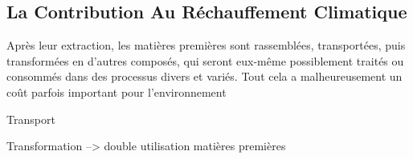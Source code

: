 
\subsection{La Contribution Au Réchauffement Climatique}


Après leur extraction, les matières premières sont rassemblées, transportées, puis transformées en d'autres composés, qui seront eux-même possiblement traités ou consommés dans des processus divers et variés. Tout cela a malheureusement un coût parfois important pour l'environnement

\medbreak 



Transport


Transformation
--> double utilisation matières premières



